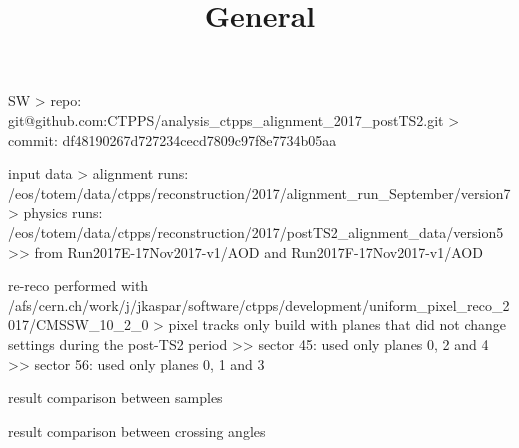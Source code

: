 


\newpage %

\def\author{J.~Kašpar}
\def\caption{CTPPS alignment 2017 post-TS2}
\def\date{\the\year/\the\month/\the\day}

\let\NormalFonts\SetFontSizesX

\newpage %
\title{General}

\> SW
\>> repo: git@github.com:CTPPS/analysis\_ctpps\_alignment\_2017\_postTS2.git
\>> commit: df48190267d727234cecd7809c97f8e7734b05aa

\> input data
\>> alignment runs:\\ /eos/totem/data/ctpps/reconstruction/2017/alignment\_run\_September/version7
\>> physics runs:\\ /eos/totem/data/ctpps/reconstruction/2017/postTS2\_alignment\_data/version5
\>>> from Run2017E-17Nov2017-v1/AOD and Run2017F-17Nov2017-v1/AOD

\> re-reco performed with\\
/afs/cern.ch/work/j/jkaspar/software/ctpps/development/uniform\_pixel\_reco\_2017/CMSSW\_10\_2\_0
\>> pixel tracks only build with planes that did not change settings during the post-TS2 period
\>>> sector 45: used only planes 0, 2 and 4
\>>> sector 56: used only planes 0, 1 and 3


\newpage %

\centerline{}

\newpage %

\> result comparison between samples

\centerline{}

\newpage %

\> result comparison between crossing angles

\centerline{}



